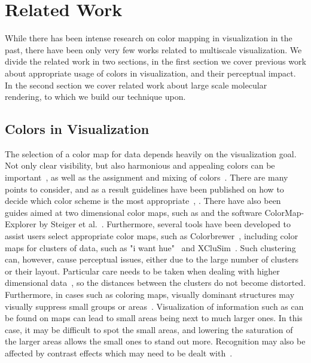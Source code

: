 \documentclass[review,journal]{vgtc}         %
\begin{document}
	\section{Related Work}
	While there has been intense research on color mapping in visualization in the past, there have been only very few works related to multiscale visualization.
	We divide the related work in two sections, in the first section we cover previous work about appropriate usage of colors in visualization, and their perceptual impact. 
	In the second section we cover related work about large scale molecular rendering, to which we build our technique upon.
		
	\subsection{Colors in Visualization}
	The selection of  a color map for data depends heavily on the visualization goal. 
	Not only clear visibility, but also harmonious and appealing colors can be important~\cite{ihaka2003colour}, as well as the assignment and mixing of colors~\cite{wang2008color}. 
	There are many points to consider, and as a result guidelines have been published on how to decide which color scheme is the most appropriate~\cite{bergman1995rule}, \cite{healey1996choosing}. There have also been guides aimed at two dimensional color maps, such as \cite{bernard2015survey} and the software ColorMap-Explorer by Steiger et al.~\cite{steiger2015explorative}.	
	Furthermore, several tools have been developed to assist users select appropriate color maps, such as Colorbrewer~\cite{harrower2003colorbrewer}, including color maps for clusters of data, such as "i want hue"~\cite{iwanthue} and XCluSim~\cite{l2015xclusim}. 	
	Such clustering can, however, cause perceptual issues, either due to the large number of clusters or their layout. 
	Particular care needs to be taken when dealing with higher dimensional data~\cite{mittelstiidt2014revisiting}, so the distances between the clusters do not become distorted. 
	Furthermore, in cases such as coloring maps, visually dominant structures may visually suppress small groups or areas~\cite{lee2013perceptually}.
	Visualization of information such as can be found on maps can lead to small areas being next to much larger ones. 
	In this case, it may be difficult to spot the small areas, and lowering the saturation of the larger areas allows the small ones to stand out more.
	Recognition may also be affected by contrast effects which may need to be dealt with~\cite{mittelstadt2014methods}. \\
		
\end{document}
